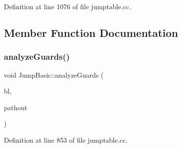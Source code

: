 Definition at line 1076 of file jumptable.\+cc.



\subsection{Member Function Documentation}
\mbox{\label{class_jump_basic_ae00e064a5ca6c4dcd06e245fbc997e5b}} 
\subsubsection{\texorpdfstring{analyzeGuards()}{analyzeGuards()}}
{\footnotesize\ttfamily void Jump\+Basic\+::analyze\+Guards (\begin{DoxyParamCaption}\item[{\mbox{\hyperlink{class_block_basic}{Block\+Basic}} $\ast$}]{bl,  }\item[{int4}]{pathout }\end{DoxyParamCaption})\hspace{0.3cm}{\ttfamily [protected]}}



Definition at line 853 of file jumptable.\+cc.

